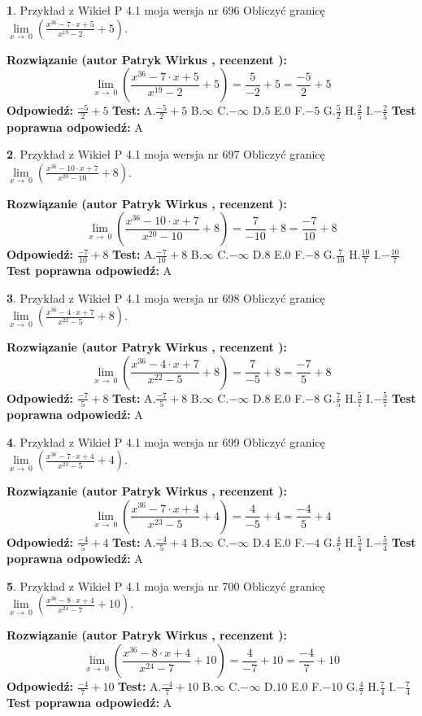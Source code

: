 \documentclass[12pt, a4paper]{article}
\theoremstyle{definition} %
\newtheorem{zad}{}
\newcommand{\zadStart}[1]{\begin{zad}#1\newline}
\newcommand{\zadStop}{\end{zad}}
\newcommand{\rozwStart}[2]{\noindent \textbf{Rozwiązanie (autor #1 , recenzent #2): }\newline}
\newcommand{\rozwStop}{\newline}
\newcommand{\odpStart}{\noindent \textbf{Odpowiedź:}\newline}
\newcommand{\odpStop}{\newline}
\newcommand{\testStart}{\noindent \textbf{Test:}\newline}
\newcommand{\testStop}{\newline}
\newcommand{\kluczStart}{\noindent \textbf{Test poprawna odpowiedź:}\newline}
\newcommand{\kluczStop}{\newline}
\begin{document}
\zadStart{Przykład z Wikieł P 4.1 moja wersja nr 696}
Obliczyć granicę $\lim\limits_{x\to\ 0}(\frac{x^{36}-7 \cdot x +5}{x^{19}-2}+5)$.
\zadStop
\rozwStart{Patryk Wirkus}{}
$$\lim\limits_{x\to\ 0}(\frac{x^{36}-7 \cdot x +5}{x^{19}-2}+5)=\frac{5}{-2}+5=\frac{-5}{2}+5$$
\rozwStop
\odpStart
$\frac{-5}{2}+5$
\odpStop
\testStart
A.$\frac{-5}{2}+5$
B.$\infty$
C.$-\infty$
D.$5$
E.$0$
F.$-5$
G.$\frac{5}{2}$
H.$\frac{2}{5}$
I.$-\frac{2}{5}$
\testStop
\kluczStart
A
\kluczStop



\zadStart{Przykład z Wikieł P 4.1 moja wersja nr 697}
Obliczyć granicę $\lim\limits_{x\to\ 0}(\frac{x^{36}-10 \cdot x +7}{x^{20}-10}+8)$.
\zadStop
\rozwStart{Patryk Wirkus}{}
$$\lim\limits_{x\to\ 0}(\frac{x^{36}-10 \cdot x +7}{x^{20}-10}+8)=\frac{7}{-10}+8=\frac{-7}{10}+8$$
\rozwStop
\odpStart
$\frac{-7}{10}+8$
\odpStop
\testStart
A.$\frac{-7}{10}+8$
B.$\infty$
C.$-\infty$
D.$8$
E.$0$
F.$-8$
G.$\frac{7}{10}$
H.$\frac{10}{7}$
I.$-\frac{10}{7}$
\testStop
\kluczStart
A
\kluczStop



\zadStart{Przykład z Wikieł P 4.1 moja wersja nr 698}
Obliczyć granicę $\lim\limits_{x\to\ 0}(\frac{x^{36}-4 \cdot x +7}{x^{22}-5}+8)$.
\zadStop
\rozwStart{Patryk Wirkus}{}
$$\lim\limits_{x\to\ 0}(\frac{x^{36}-4 \cdot x +7}{x^{22}-5}+8)=\frac{7}{-5}+8=\frac{-7}{5}+8$$
\rozwStop
\odpStart
$\frac{-7}{5}+8$
\odpStop
\testStart
A.$\frac{-7}{5}+8$
B.$\infty$
C.$-\infty$
D.$8$
E.$0$
F.$-8$
G.$\frac{7}{5}$
H.$\frac{5}{7}$
I.$-\frac{5}{7}$
\testStop
\kluczStart
A
\kluczStop



\zadStart{Przykład z Wikieł P 4.1 moja wersja nr 699}
Obliczyć granicę $\lim\limits_{x\to\ 0}(\frac{x^{36}-7 \cdot x +4}{x^{23}-5}+4)$.
\zadStop
\rozwStart{Patryk Wirkus}{}
$$\lim\limits_{x\to\ 0}(\frac{x^{36}-7 \cdot x +4}{x^{23}-5}+4)=\frac{4}{-5}+4=\frac{-4}{5}+4$$
\rozwStop
\odpStart
$\frac{-4}{5}+4$
\odpStop
\testStart
A.$\frac{-4}{5}+4$
B.$\infty$
C.$-\infty$
D.$4$
E.$0$
F.$-4$
G.$\frac{4}{5}$
H.$\frac{5}{4}$
I.$-\frac{5}{4}$
\testStop
\kluczStart
A
\kluczStop



\zadStart{Przykład z Wikieł P 4.1 moja wersja nr 700}
Obliczyć granicę $\lim\limits_{x\to\ 0}(\frac{x^{36}-8 \cdot x +4}{x^{24}-7}+10)$.
\zadStop
\rozwStart{Patryk Wirkus}{}
$$\lim\limits_{x\to\ 0}(\frac{x^{36}-8 \cdot x +4}{x^{24}-7}+10)=\frac{4}{-7}+10=\frac{-4}{7}+10$$
\rozwStop
\odpStart
$\frac{-4}{7}+10$
\odpStop
\testStart
A.$\frac{-4}{7}+10$
B.$\infty$
C.$-\infty$
D.$10$
E.$0$
F.$-10$
G.$\frac{4}{7}$
H.$\frac{7}{4}$
I.$-\frac{7}{4}$
\testStop
\kluczStart
A
\kluczStop
\end{document}
